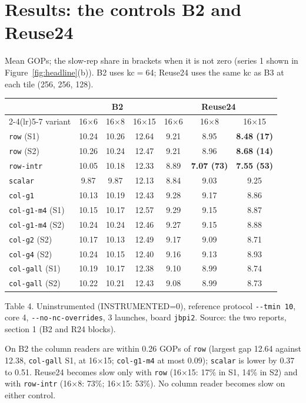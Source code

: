 \documentclass[10pt,a4paper]{article}
\newcommand{\bad}[1]{\textcolor{red!70!black}{\textbf{#1}}}
\begin{document}
\section{Results: the controls B2 and Reuse24}
Mean GOPs; the slow-rep share in brackets when it is not zero (series 1 shown in Figure~\ref{fig:headline}(b)). B2 uses kc$=$64; Reuse24 uses the same kc as B3 at each tile (256, 256, 128).

\begin{center}\footnotesize\setlength{\tabcolsep}{4pt}
\begin{tabular}{@{}lcccccc@{}}
\toprule
 & \multicolumn{3}{c}{B2} & \multicolumn{3}{c}{Reuse24} \\
\cmidrule(lr){2-4}\cmidrule(lr){5-7}
variant & 16$\times$6 & 16$\times$8 & 16$\times$15 & 16$\times$6 & 16$\times$8 & 16$\times$15 \\
\midrule
\texttt{row} (S1) & 10.24 & 10.26 & 12.64 & 9.21 & 8.95 & \bad{8.48 (17)} \\
\texttt{row} (S2) & 10.26 & 10.24 & 12.47 & 9.21 & 8.96 & \bad{8.68 (14)} \\
\texttt{row-intr} & 10.05 & 10.18 & 12.33 & 8.89 & \bad{7.07 (73)} & \bad{7.55 (53)} \\
\texttt{scalar} & 9.87 & 9.87 & 12.13 & 8.84 & 9.03 & 9.25 \\
\texttt{col-g1} & 10.13 & 10.19 & 12.43 & 9.28 & 9.17 & 8.86 \\
\texttt{col-g1-m4} (S1) & 10.15 & 10.17 & 12.57 & 9.29 & 9.15 & 8.87 \\
\texttt{col-g1-m4} (S2) & 10.24 & 10.24 & 12.46 & 9.27 & 9.15 & 8.88 \\
\texttt{col-g2} (S2) & 10.17 & 10.13 & 12.49 & 9.17 & 9.09 & 8.71 \\
\texttt{col-g4} (S2) & 10.24 & 10.15 & 12.40 & 9.16 & 9.13 & 8.93 \\
\texttt{col-gall} (S1) & 10.19 & 10.17 & 12.38 & 9.10 & 8.99 & 8.74 \\
\texttt{col-gall} (S2) & 10.22 & 10.21 & 12.43 & 9.08 & 8.99 & 8.73 \\
\bottomrule
\end{tabular}
\end{center}
{\footnotesize Table 4. Uninstrumented (INSTRUMENTED=0), reference protocol \texttt{-{}-tmin 10}, core 4, \texttt{-{}-no-nc-overrides}, 3 launches, board \texttt{jbpi2}.
Source: the two reports, section 1 (B2 and R24 blocks).}

On B2 the column readers are within 0.26 GOPs of \texttt{row} (largest gap 12.64 against 12.38, \texttt{col-gall} S1, at 16$\times$15;
\texttt{col-g1-m4} at most 0.09); \texttt{scalar} is lower
by 0.37 to 0.51. Reuse24 becomes slow only with \texttt{row} (16$\times$15: 17\% in S1, 14\% in S2) and with \texttt{row-intr}
(16$\times$8: 73\%; 16$\times$15: 53\%). No column reader becomes slow on either control.
\end{document}
